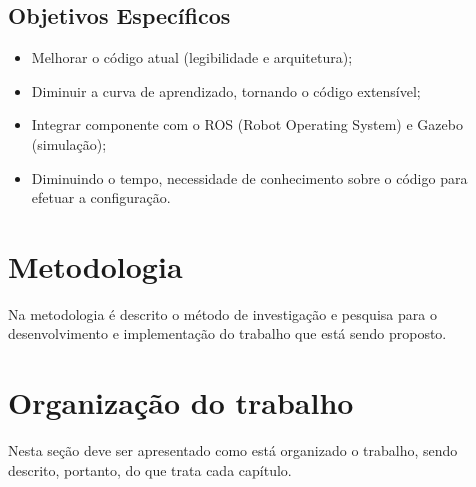 \subsection{Objetivos Específicos} 

\begin{itemize}
	\item Melhorar o código atual (legibilidade e arquitetura);
	\item Diminuir a curva de aprendizado, tornando o código extensível;
	\item Integrar componente com o ROS (Robot Operating System) e Gazebo (simulação);
	\item Diminuindo o tempo, necessidade de conhecimento sobre o código para efetuar a configuração.
\end{itemize}

\section{Metodologia}

Na metodologia é descrito o método de investigação e pesquisa para o
desenvolvimento e implementação do trabalho que está sendo proposto.

\section{Organização do trabalho}

Nesta seção deve ser apresentado como está organizado o trabalho, sendo
descrito, portanto, do que trata cada capítulo.
